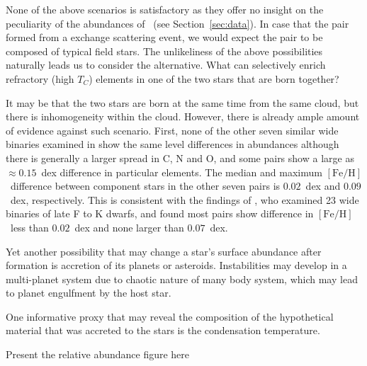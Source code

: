 \documentclass[manuscript]{aastex6}
\newcommand{\sectionname}{Section}
\newcommand*\elem[1]{\ensuremath{\mathrm{#1}}}
\newcommand*\elemH[1]{\ensuremath{[\mathrm{#1}/\elem{H}]}}
\newcommand*{\feh}{\ensuremath{\elemH{Fe}}}
\newcommand{\bizarreone}{\text{Kronos}}
\begin{document}
None of the above scenarios is satisfactory as they offer no
insight on the peculiarity of the abundances of \bizarreone\
(see \sectionname~{\ref{sec:data}}).
In case that the pair formed from a exchange scattering event,
we would expect the pair to be composed of typical field stars.
The unlikeliness of the above possibilities naturally leads us to
consider the alternative.
What can selectively enrich refractory (high $T_C$) elements
in one of the two stars that are born together?

It may be that the two stars are born at the same time from the same cloud, but
there is inhomogeneity within the cloud.
However, there is already ample amount of evidence against such scenario.
First, none of the other seven similar wide binaries examined in \citealt{2016ApJS..225...32B}
show the same level differences in abundances although there is generally
a larger spread in $\elem{C}$, $\elem{N}$ and $\elem{O}$, and some pairs show
a large as $\approx 0.15$~dex difference in particular elements.
The median and maximum \feh\ difference between component stars in the other seven pairs
is $0.02$~dex and $0.09$~dex, respectively.
This is consistent with the findings of \citealt{Desidera:2004aa}, who examined 23 wide binaries
of late F to K dwarfs, and found most pairs show difference in \feh\ less than $0.02$~dex
and none larger than $0.07$~dex.

Yet another possibility that may change a star's surface abundance after formation
is accretion of its planets or asteroids.
Instabilities may develop in a multi-planet system due to chaotic
nature of many body system, which may lead to planet engulfment by the host star.

One informative proxy that may reveal the composition of the hypothetical material
that was accreted to the stars is the condensation temperature.

Present the relative abundance figure here
\end{document}
